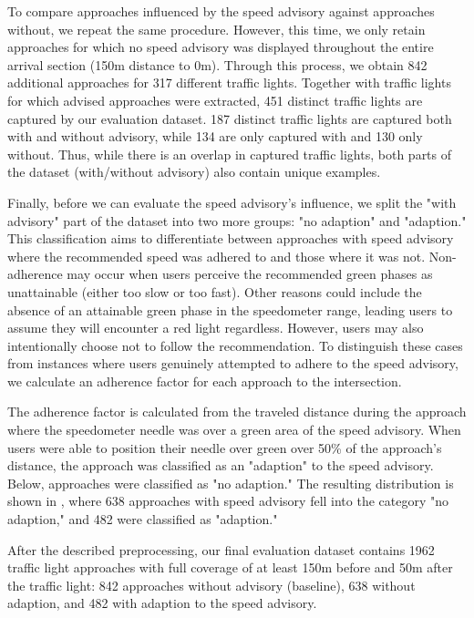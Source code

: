 To compare approaches influenced by the speed advisory against approaches without, we repeat the same procedure. However, this time, we only retain approaches for which no speed advisory was displayed throughout the entire arrival section (150m distance to 0m). Through this process, we obtain 842 additional approaches for 317 different traffic lights. Together with traffic lights for which advised approaches were extracted, 451 distinct traffic lights are captured by our evaluation dataset. 187 distinct traffic lights are captured both with and without advisory, while 134 are only captured with and 130 only without. Thus, while there is an overlap in captured traffic lights, both parts of the dataset (with/without advisory) also contain unique examples.

Finally, before we can evaluate the speed advisory's influence, we split the "with advisory" part of the dataset into two more groups: "no adaption" and "adaption." This classification aims to differentiate between approaches with speed advisory where the recommended speed was adhered to and those where it was not. Non-adherence may occur when users perceive the recommended green phases as unattainable (either too slow or too fast). Other reasons could include the absence of an attainable green phase in the speedometer range, leading users to assume they will encounter a red light regardless. However, users may also intentionally choose not to follow the recommendation. To distinguish these cases from instances where users genuinely attempted to adhere to the speed advisory, we calculate an adherence factor for each approach to the intersection.

The adherence factor is calculated from the traveled distance during the approach where the speedometer needle was over a green area of the speed advisory. When users were able to position their needle over green over 50\% of the approach's distance, the approach was classified as an "adaption" to the speed advisory. Below, approaches were classified as "no adaption." The resulting distribution is shown in , where 638 approaches with speed advisory fell into the category "no adaption," and 482 were classified as "adaption."

After the described preprocessing, our final evaluation dataset contains 1962 traffic light approaches with full coverage of at least 150m before and 50m after the traffic light: 842 approaches without advisory (baseline), 638 without adaption, and 482 with adaption to the speed advisory.

